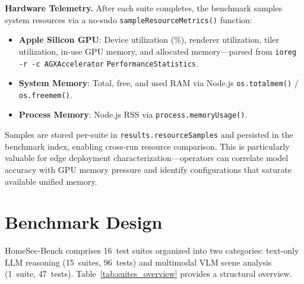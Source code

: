 \documentclass[conference]{IEEEtran}
\begin{document}
\textbf{Hardware Telemetry.} After each suite completes, the benchmark
samples system resources via a no-sudo \texttt{sampleResourceMetrics()}
function:
\begin{itemize}[nosep]
    \item \textbf{Apple Silicon GPU}: Device utilization (\%), renderer
    utilization, tiler utilization, in-use GPU memory, and allocated
    memory---parsed from \texttt{ioreg -r -c AGXAccelerator}
    \texttt{PerformanceStatistics}.
    \item \textbf{System Memory}: Total, free, and used RAM via Node.js
    \texttt{os.totalmem()} / \texttt{os.freemem()}.
    \item \textbf{Process Memory}: Node.js RSS via
    \texttt{process.memoryUsage()}.
\end{itemize}
Samples are stored per-suite in \texttt{results.resourceSamples} and
persisted in the benchmark index, enabling cross-run resource
comparison. This is particularly valuable for edge deployment
characterization---operators can correlate model accuracy with GPU
memory pressure and identify configurations that saturate available
unified memory.


\section{Benchmark Design}

HomeSec-Bench comprises 16~test suites organized into two categories:
text-only LLM reasoning (15~suites, 96~tests) and multimodal VLM scene
analysis (1~suite, 47~tests). Table~\ref{tab:suites_overview} provides
a structural overview.
\end{document}

